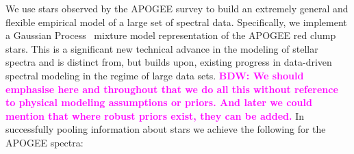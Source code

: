 \documentclass[a4paper,fleqn,usenatbib]{mnras}
\newcommand{\bdw}[1]{\textbf{\textcolor{magenta}{BDW: #1}}}
\begin{document}
 
 We use stars observed by the APOGEE survey to build an extremely
 general and flexible empirical model of a large set of spectral data.
Specifically, we implement a Gaussian Process~\citep{Rasmussen_Williams} mixture model representation of the APOGEE red clump stars. This is a significant new technical advance in the modeling of stellar spectra and is distinct from, but builds upon, existing progress in data-driven spectral modeling in the regime of large data sets. %
\bdw{We should emphasise here and throughout that  we do all this without reference to physical modeling assumptions or priors. And later we could mention that where robust priors exist, they can be added.} In successfully pooling information about stars we achieve the following for the APOGEE spectra:
\end{document}
